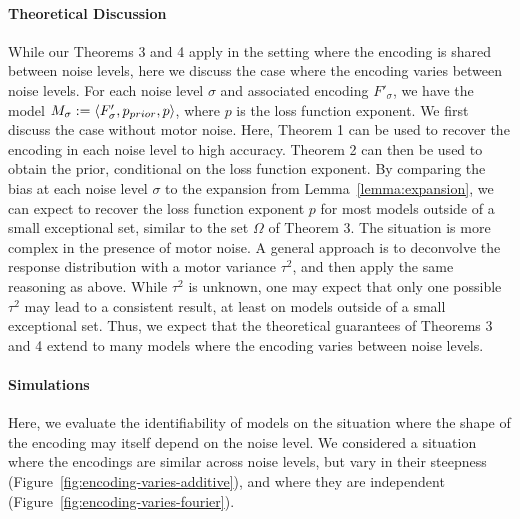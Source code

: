 \documentclass[si.tex]{subfiles}
\begin{document}
\paragraph*{Theoretical Discussion}
While our Theorems 3 and 4 apply in the setting where the encoding is shared between noise levels, here we discuss the case where the encoding varies between noise levels.
For each noise level $\sigma$ and associated encoding $F'_\sigma$, we have the model $M_\sigma := \langle F'_\sigma, p_{prior}, p\rangle$, where $p$ is the loss function exponent.
We first discuss the case without motor noise. Here, Theorem 1 can be used to recover the encoding in each noise level to high accuracy.
Theorem 2 can then be used to obtain the prior, conditional on the loss function exponent.
By comparing the bias at each noise level $\sigma$ to the expansion from Lemma~\ref{lemma:expansion}, we can expect to recover the loss function exponent $p$ for most models outside of a small exceptional set, similar to the set $\Omega$ of Theorem 3.
The situation is more complex in the presence of motor noise. A general approach is to deconvolve the response distribution with a motor variance $\tau^2$, and then apply the same reasoning as above. While $\tau^2$ is unknown, one may expect that only one possible $\tau^2$ may lead to a consistent result, at least on models outside of a small exceptional set. Thus, we expect that the theoretical guarantees of Theorems 3 and 4 extend to many models where the encoding varies between noise levels.


\paragraph*{Simulations}
Here, we evaluate the identifiability of models on the situation where the shape of the encoding may itself depend on the noise level.
We considered a situation where the encodings are similar across noise levels, but vary in their steepness (Figure~\ref{fig:encoding-varies-additive}), and where they are independent (Figure~\ref{fig:encoding-varies-fourier}).
\end{document}

